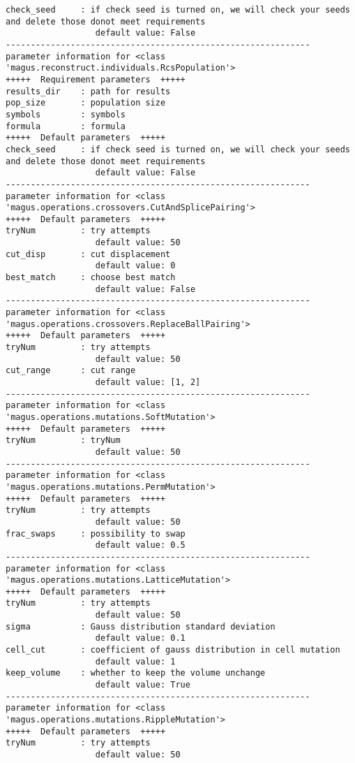 \documentclass[12pt,oneside]{book}
\begin{document}
\begin{tcolorbox}
\begin{verbatim}
check_seed     : if check seed is turned on, we will check your seeds and delete those donot meet requirements
                  default value: False
-------------------------------------------------------------
parameter information for <class 'magus.reconstruct.individuals.RcsPopulation'>
+++++  Requirement parameters  +++++
results_dir    : path for results
pop_size       : population size
symbols        : symbols
formula        : formula
+++++  Default parameters  +++++
check_seed     : if check seed is turned on, we will check your seeds and delete those donot meet requirements
                  default value: False
-------------------------------------------------------------
parameter information for <class 'magus.operations.crossovers.CutAndSplicePairing'>
+++++  Default parameters  +++++
tryNum         : try attempts
                  default value: 50
cut_disp       : cut displacement
                  default value: 0
best_match     : choose best match
                  default value: False
-------------------------------------------------------------
parameter information for <class 'magus.operations.crossovers.ReplaceBallPairing'>
+++++  Default parameters  +++++
tryNum         : try attempts
                  default value: 50
cut_range      : cut range
                  default value: [1, 2]
-------------------------------------------------------------
parameter information for <class 'magus.operations.mutations.SoftMutation'>
+++++  Default parameters  +++++
tryNum         : tryNum
                  default value: 50
-------------------------------------------------------------
parameter information for <class 'magus.operations.mutations.PermMutation'>
+++++  Default parameters  +++++
tryNum         : try attempts
                  default value: 50
frac_swaps     : possibility to swap
                  default value: 0.5
-------------------------------------------------------------
parameter information for <class 'magus.operations.mutations.LatticeMutation'>
+++++  Default parameters  +++++
tryNum         : try attempts
                  default value: 50
sigma          : Gauss distribution standard deviation
                  default value: 0.1
cell_cut       : coefficient of gauss distribution in cell mutation
                  default value: 1
keep_volume    : whether to keep the volume unchange
                  default value: True
-------------------------------------------------------------
parameter information for <class 'magus.operations.mutations.RippleMutation'>
+++++  Default parameters  +++++
tryNum         : try attempts
                  default value: 50

\end{verbatim}
\end{tcolorbox}
\end{document}
